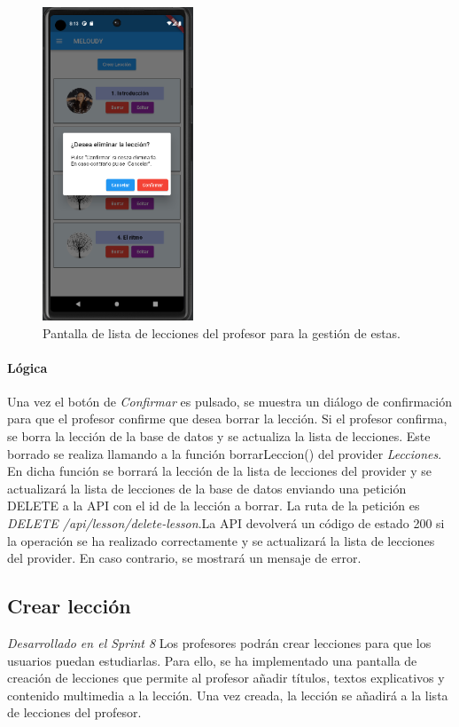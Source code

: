 \begin{figure}[H]
  \centering
  \includegraphics[width=0.4\textwidth]{imagenes/c7/borrarleccion.png}
  \caption{Pantalla de lista de lecciones del profesor para la gestión de estas.} 
  \label{fig:login}
\end{figure}

\paragraph*{Lógica}
Una vez el botón de \textit{Confirmar} es pulsado, se muestra un diálogo de confirmación para que el profesor confirme que desea borrar la lección. Si el profesor confirma, se borra la lección de la base de datos y se actualiza la lista de lecciones.
Este borrado se realiza llamando a la función borrarLeccion() del provider \textit{Lecciones}. En dicha función se borrará la lección de la lista de lecciones del provider y se actualizará la lista de lecciones de la base de datos enviando
una petición DELETE a la API con el id de la lección a borrar. La ruta de la petición es \textit{DELETE /api/lesson/delete-lesson}.La API devolverá un código de estado 200 si la operación se ha realizado correctamente y se actualizará la lista de lecciones del provider. En caso contrario, se mostrará un mensaje de error.

\newpage
\subsection{Crear lección} 
\textit{Desarrollado en el Sprint 8}
Los profesores podrán crear lecciones para que los usuarios puedan estudiarlas. Para ello, se ha implementado una pantalla de creación de lecciones que permite al profesor añadir títulos, textos explicativos y contenido multimedia a la lección. Una vez creada, la lección se añadirá a la lista de lecciones del profesor.


